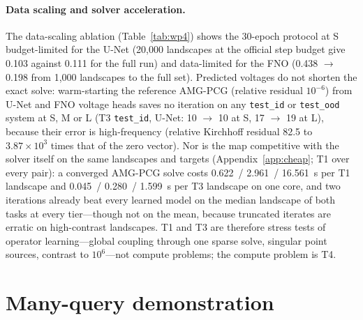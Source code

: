 \documentclass{article}
\newcommand{\code}[1]{\texttt{#1}}
\begin{document}
\paragraph{Data scaling and solver acceleration.} The data-scaling ablation (Table~\ref{tab:wp4}) shows the 30-epoch protocol at S budget-limited for the U-Net (20,000 landscapes at the official step budget give 0.103 against 0.111 for the full run) and data-limited for the FNO (0.438 $\rightarrow$ 0.198 from 1,000 landscapes to the full set). Predicted voltages do not shorten the exact solve: warm-starting the reference AMG-PCG (relative residual $10^{-6}$) from U-Net and FNO voltage heads saves no iteration on any \code{test\_id} or \code{test\_ood} system at S, M or L (T3 \code{test\_id}, U-Net: 10 $\rightarrow$ 10 at S, 17 $\rightarrow$ 19 at L), because their error is high-frequency (relative Kirchhoff residual 82.5 to $3.87\times 10^{3}$ times that of the zero vector). Nor is the map competitive with the solver itself on the same landscapes and targets (Appendix~\ref{app:cheap}; T1 over every pair): a converged AMG-PCG solve costs 0.622~/ 2.961~/ 16.561~s per T1 landscape and 0.045~/ 0.280~/ 1.599~s per T3 landscape on one core, and two iterations already beat every learned model on the median landscape of both tasks at every tier---though not on the mean, because truncated iterates are erratic on high-contrast landscapes. T1 and T3 are therefore stress tests of operator learning---global coupling through one sparse solve, singular point sources, contrast to $10^6$---not compute problems; the compute problem is T4.

\section{Many-query demonstration}
\label{sec:wp7}
\end{document}
